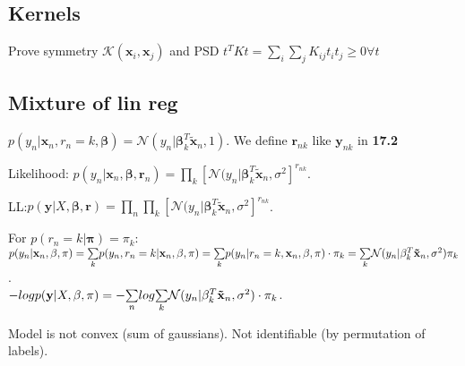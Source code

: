 \subsection{Kernels}
Prove symmetry $\mathcal{K}(\mathbf{x}_i, \mathbf{x}_j)$ and PSD $t^T K t = \sum_i \sum_j K_{ij} t_i t_j \geq 0 \forall t$

\subsection{Mixture of lin reg}
$p(y_n|\mathbf{x}_n, r_n = k, \mathbf{\beta}) = \mathcal{N}(y_n|\mathbf{\beta}_k^T \mathbf{\tilde{x}}_n, 1)$. We define $\mathbf{r}_{nk}$ like $\mathbf{y}_{nk}$ in \textbf{17.2}

Likelihood: \newline $p(y_n|\mathbf{x}_n, \mathbf{\beta}, \mathbf{r}_n) = \underset{k}{\prod} [\mathcal{N}(y_n|\mathbf{\beta}_k^T \mathbf{\tilde{x}}_n , \sigma^2]^{r_{nk}}$. 

LL:\newline $p(\mathbf{y}|X, \mathbf{\beta}, \mathbf{r}) = \underset{n}{\prod} \underset{k}{\prod} [\mathcal{N}(y_n|\mathbf{\beta}_k^T \mathbf{\tilde{x}}_n , \sigma^2]^{r_{nk}}$. 

For $p(r_n = k | \mathbf{\pi}) = \pi_k$: \newline
$p(y_n|\mathbf{x}_n, \mathbf{\beta}, \mathbf{\pi}) = \underset{k}{\sum} p(y_n, r_n = k| \mathbf{x}_n, \beta, \mathbf{\pi}) \newline = \underset{k}{\sum} p(y_n | r_n = k, \mathbf{x}_n, \beta, \pi) \cdot \pi_k \newline = \underset{k}{\sum} \mathcal{N}(y_n|\beta^T_k \mathbf{\tilde{x}}_n, \sigma^2) \pi_k$.\\

$- log p(\mathbf{y} | X, \beta, \mathbf{\pi}) \newline= -\underset{n}{\sum} log \underset{k}{\sum} \mathcal{N}(y_n|\beta^T_k \mathbf{\tilde{x}}_n, \sigma^2) \cdot \pi_k$.

Model is not convex (sum of gaussians). Not identifiable (by permutation of labels).




